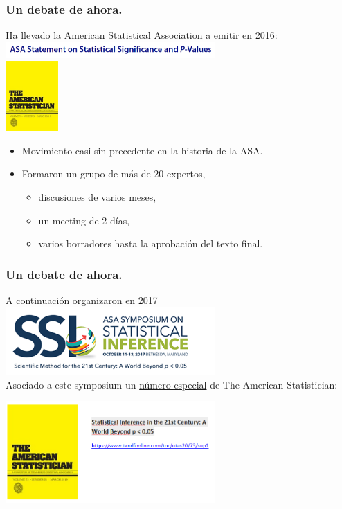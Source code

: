 \documentclass[9pt]{beamer}
\begin{document}
\begin{frame}
  \frametitle{Un debate de ahora.}
  Ha llevado la American Statistical Association a emitir en 2016:\\
  \includegraphics[width=8cm]{images/asa_statement}\\ 
\hfill \includegraphics[width=2cm]{images/american_statistician_portada}
  \begin{itemize}
  \item<4-> Movimiento casi sin precedente en la historia de la ASA.
  \item<5-> Formaron un grupo de más de 20 expertos,
    \begin{itemize}
    \item     discusiones de
    varios meses,
  \item  un meeting de 2 días, 
  \item varios borradores hasta la
    aprobación del texto final.
    \end{itemize}
  \end{itemize}
 
\end{frame}
\begin{frame}
  \frametitle{Un debate de ahora.}
  A continuación organizaron en 2017
  \includegraphics[width=8cm]{images/asa_symposium}\\ 
  Asociado a este symposium un \href{https://www.tandfonline.com/toc/utas20/73/sup1}{número especial} de The American
  Statistician:

  \begin{center}
    \includegraphics[width=8cm]{images/asa_special_issue}
  \end{center}
 
\end{frame}
\end{document}
